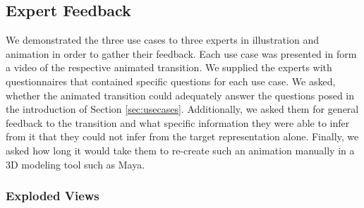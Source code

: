 
\subsection{Expert Feedback}

We demonstrated the three use cases to three experts in illustration and animation in order to gather their feedback.
Each use case was presented in form a video of the respective animated transition.
We supplied the experts with questionnaires that contained specific questions for each use case.
We asked, whether the animated transition could adequately answer the questions posed in the introduction of Section \ref{sec:usecases}. Additionally, we asked them for general feedback to the transition and what specific information they were able to infer from it that they could not infer from the target representation alone. Finally, we asked how long it would take them to re-create such an animation manually in a 3D modeling tool such as Maya.



\subsubsection{Exploded Views}





